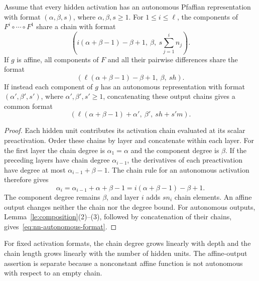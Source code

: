 \begin{proposition}\label{prop:nn-format}
Assume that every hidden activation has an autonomous Pfaffian representation with format $(\alpha,\beta,s)$, where $\alpha,\beta,s\ge1$. For $1\le i\le\ell$, the components of $F^i\circ\cdots\circ F^1$ share a chain with format
\[
\left(i(\alpha+\beta-1)-\beta+1,\ \beta,\ s\sum_{j=1}^i n_j\right).
\]
If $g$ is affine, all components of $F$ and all their pairwise differences share the format
\begin{equation}\label{eq:nn-affine-format}
\left(\ell(\alpha+\beta-1)-\beta+1,\ \beta,\ sh\right).
\end{equation}
If instead each component of $g$ has an autonomous representation with format $(\alpha',\beta',s')$, where $\alpha',\beta',s'\ge1$, concatenating these output chains gives a common format
\begin{equation}\label{eq:nn-autonomous-format}
\left(\ell(\alpha+\beta-1)+\alpha',\ \beta',\ sh+s'm\right).
\end{equation}
\end{proposition}

\begin{proof}
Each hidden unit contributes its activation chain evaluated at its scalar preactivation. Order these chains by layer and concatenate within each layer. For the first layer the chain degree is $\alpha_1=\alpha$ and the component degree is $\beta$. If the preceding layers have chain degree $\alpha_{i-1}$, the derivatives of each preactivation have degree at most $\alpha_{i-1}+\beta-1$. The chain rule for an autonomous activation therefore gives
\[
\alpha_i=\alpha_{i-1}+\alpha+\beta-1
=i(\alpha+\beta-1)-\beta+1.
\]
The component degree remains $\beta$, and layer $i$ adds $sn_i$ chain elements. An affine output changes neither the chain nor the degree bound. For autonomous outputs, Lemma~\ref{le:composition}(2)--(3), followed by concatenation of their chains, gives~\eqref{eq:nn-autonomous-format}.
\end{proof}

For fixed activation formats, the chain degree grows linearly with depth and the chain length grows linearly with the number of hidden units. The affine-output assertion is separate because a nonconstant affine function is not autonomous with respect to an empty chain.

